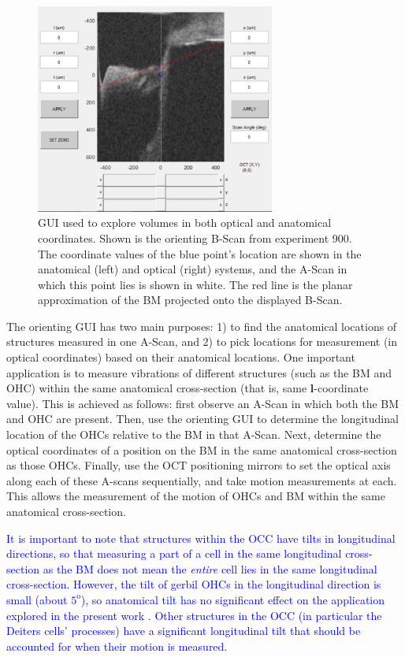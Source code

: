 \documentclass[preprint,NumberedRefs]{JASA}
\begin{document}
\begin{figure}[h!]
\centering
\includegraphics[width=0.7\textwidth]{Figure3.pdf}
\caption{GUI used to explore volumes in both optical and anatomical coordinates. Shown is the orienting B-Scan from experiment 900. The coordinate values of the blue point's location are shown in the anatomical (left) and optical (right) systems, and the A-Scan in which this point lies is shown in white. The red line is the planar approximation of the BM projected onto the displayed B-Scan.}
\label{gui}
\end{figure}

\par{The orienting GUI has two main purposes: 1) to find the anatomical locations of structures measured in one A-Scan, and 2) to pick locations for measurement (in optical coordinates) based on their anatomical locations. One important application is to measure vibrations of different structures (such as the BM and OHC) within the same anatomical cross-section (that is, same $\mathbf{l}$-coordinate value). This is achieved as follows: first observe an A-Scan in which both the BM and OHC are present. Then, use the orienting GUI to determine the longitudinal location of the OHCs relative to the BM in that A-Scan. Next, determine the optical coordinates of a position on the BM in the same anatomical cross-section as those OHCs.  Finally, use the OCT positioning mirrors to set the optical axis along each of these A-scans sequentially, and take motion measurements at each. This allows the measurement of the motion of OHCs and BM within the same anatomical cross-section.}
\par{\textcolor{blue}{It is important to note that structures within the OCC have tilts in longitudinal directions, so that measuring a part of a cell in the same longitudinal cross-section as the BM does not mean the \textit{entire} cell lies in the same longitudinal cross-section. However, the tilt of gerbil OHCs in the longitudinal direction is small (about $5^\text{o}$), so anatomical tilt has no significant effect on the application explored in the present work \cite{yoon}. Other structures in the OCC (in particular the Deiters cells' processes) have a significant longitudinal tilt that should be accounted for when their motion is measured.}}
\end{document}
